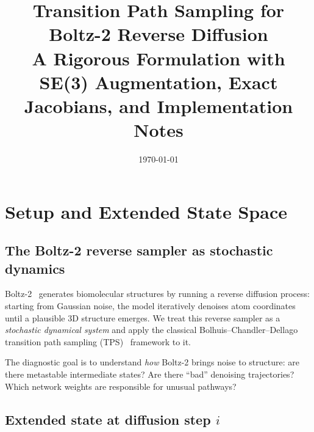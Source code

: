 \documentclass[11pt,a4paper]{article}
\title{\textbf{Transition Path Sampling for Boltz-2 Reverse Diffusion}\\
\large A Rigorous Formulation with SE(3) Augmentation,
Exact Jacobians, and Implementation Notes}
\author{}
\date{\today}
\begin{document}
\maketitle
\tableofcontents
\newpage

\section{Setup and Extended State Space}
\label{sec:setup}

\subsection{The Boltz-2 reverse sampler as stochastic dynamics}

Boltz-2~\cite{boltz2} generates biomolecular structures by running a
reverse diffusion process: starting from Gaussian noise, the model
iteratively denoises atom coordinates until a plausible 3D structure
emerges.  We treat this reverse sampler as a
\emph{stochastic dynamical system} and apply the classical
Bolhuis--Chandler--Dellago transition path sampling
(TPS)~\cite{bolhuis2002,falkner2023} framework to it.

The diagnostic goal is to understand \emph{how} Boltz-2 brings noise
to structure: are there metastable intermediate states?  Are there
``bad'' denoising trajectories?  Which network weights are responsible
for unusual pathways?

\subsection{Extended state at diffusion step $i$}
\label{sec:extended-state}
\end{document}
